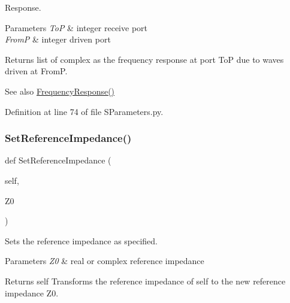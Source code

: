 Response. 


\begin{DoxyParams}{Parameters}
{\em ToP} & integer receive port \\
\hline
{\em FromP} & integer driven port \\
\hline
\end{DoxyParams}
\begin{DoxyReturn}{Returns}
list of complex as the frequency response at port ToP due to waves driven at FromP. 
\end{DoxyReturn}
\begin{DoxySeeAlso}{See also}
\hyperlink{classSignalIntegrity_1_1SParameters_1_1SParameters_1_1SParameters_a55a7157cd888766a891ff22694e62613}{Frequency\+Response()} 
\end{DoxySeeAlso}


Definition at line 74 of file S\+Parameters.\+py.

\mbox{\label{classSignalIntegrity_1_1SParameters_1_1SParameters_1_1SParameters_a98bb8cca60faa48d8aa1b2b667c36037}} 
\subsubsection{\texorpdfstring{Set\+Reference\+Impedance()}{SetReferenceImpedance()}}
{\footnotesize\ttfamily def Set\+Reference\+Impedance (\begin{DoxyParamCaption}\item[{}]{self,  }\item[{}]{Z0 }\end{DoxyParamCaption})}



Sets the reference impedance as specified. 


\begin{DoxyParams}{Parameters}
{\em Z0} & real or complex reference impedance \\
\hline
\end{DoxyParams}
\begin{DoxyReturn}{Returns}
self Transforms the reference impedance of self to the new reference impedance Z0. 
\end{DoxyReturn}


